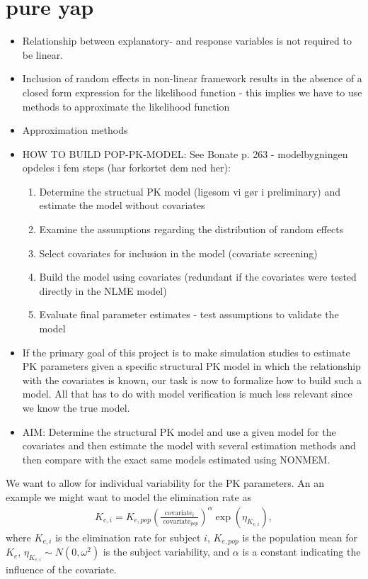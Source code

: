 \chapter{pure yap}
\begin{itemize}
    \item Relationship between explanatory- and response variables is not required to be linear.
    \item Inclusion of random effects in non-linear framework results in the absence of a closed form expression for the likelihood function - this implies we have to use methods to approximate the likelihood function
    \item Approximation methods
    \item HOW TO BUILD POP-PK-MODEL: See Bonate p. 263 - modelbygningen opdeles i fem steps (har forkortet dem ned her):
    \begin{enumerate}
        \item Determine the structual PK model (ligesom vi gør i preliminary) and estimate the model without covariates
        \item Examine the assumptions regarding the distribution of random effects
        \item Select covariates for inclusion in the model (covariate screening)
        \item Build the model using covariates (redundant if the covariates were tested directly in the NLME model)
        \item Evaluate final parameter estimates - test assumptions to validate the model
    \end{enumerate}
    \item If the primary goal of this project is to make simulation studies to estimate PK parameters given a specific structural PK model in which the relationship with the covariates is known, our task is now to formalize how to build such a model. All that has to do with model verification is much less relevant since we know the true model.
    \item AIM: Determine the structural PK model and use a given model for the covariates and then estimate the model with several estimation methods and then compare with the exact same models estimated using NONMEM.
\end{itemize}
We want to allow for individual variability for the PK parameters. An an example we might want to model the elimination rate as
\begin{align*}
    K_{e,i}=K_{e,pop}\left(\frac{\text{covariate}_i}{\text{ covariate}_{pop}}\right)^{\alpha}\exp({\eta_{K_{e,i}}}), 
\end{align*}
where $K_{e,i}$ is the elimination rate for subject $i$, $K_{e,pop}$ is the population mean for $K_{e}$, $\eta_{K_{e,i}} \sim N(0, \omega^2)$ is the subject variability, and $\alpha$ is a constant indicating the influence of the covariate.


